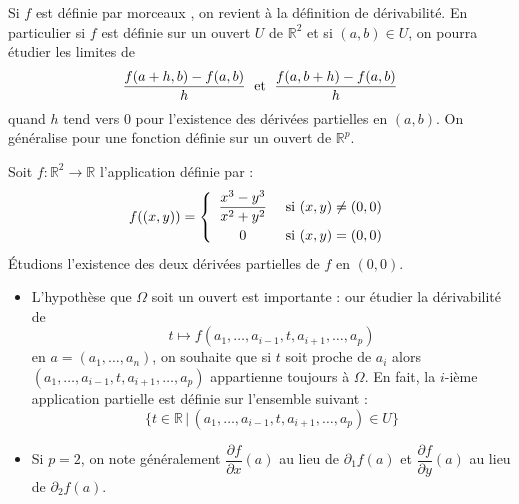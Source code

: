 \documentclass[french,11pt,twoside]{VcCours}
\begin{document}
\begin{Remarque}{} Si $f$ est définie \og par morceaux \fg, on revient à la définition de dérivabilité. En particulier si $f$ est définie sur un ouvert $U$ de $\mathbb{R}^2$ et si $(a,b) \in U$, on pourra étudier les limites de 
$$ \dfrac{f(a+h,b)-f(a,b)}{h} \; \hbox{ et } \; \dfrac{f(a,b+h)-f(a,b)}{h}$$
quand $h$ tend vers $0$ pour l'existence des dérivées partielles en $(a,b)$. On généralise pour une fonction définie sur un ouvert de $\mathbb{R}^p$.
\end{Remarque}

\medskip

\begin{Exemple}{} Soit $f : \mathbb{R}^2 \rightarrow \mathbb{R}$ l'application définie par :
$$ f((x,y)) = \left\lbrace \begin{array}{ccl}
\dfrac{x^3-y^3}{x^2+y^2} & \hbox{ si } (x,y) \neq (0,0) \\[0.3cm]
0 & \hbox{ si } (x,y)=(0,0) \\
\end{array}\right.$$
Étudions l'existence des deux dérivées partielles de $f$ en $(0,0)$.

%

\newpage

\vspace*{1cm}
\end{Exemple}



\begin{Remarques}{}
\begin{itemize}
\item L'hypothèse que $\Omega$ soit un ouvert est importante : 
our étudier la dérivabilité de 
$$  t \mapsto f(a_1, \ldots, a_{i-1}, t, a_{i+1}, \ldots, a_p) $$
en $a=(a_1, \ldots, a_n)$, on souhaite que si $t$ soit proche de $a_i$ 
alors $(a_1, \ldots, a_{i-1}, t, a_{i+1}, \ldots, a_p)$ appartienne 
toujours à $\Omega$. En fait, la $i$-ième application partielle 
est définie sur l'ensemble suivant :
$$ \lbrace t \in \mathbb{R} \, \vert \, (a_1, \ldots, a_{i-1}, t, a_{i+1}, \ldots, a_p) \in U \rbrace$$
\item Si $p=2$, on note généralement $\dfrac{\partial f}{\partial x}(a)$ 
au lieu de $\partial_1 f(a)$ et $\dfrac{\partial f}{\partial y}(a)$ 
au lieu de $\partial_2 f(a)$.
\end{itemize}
\end{Remarques}
\end{document}
